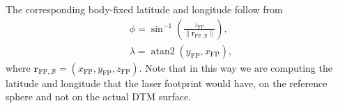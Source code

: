 \documentclass[lineno, pdflatex,sn-mathphys-ay]{sn-jnl}
\theoremstyle{thmstyleone}%
\theoremstyle{thmstyletwo}%
\theoremstyle{thmstylethree}%
\DeclareMathOperator{\atantwo}{atan2}
\renewcommand{\vec}[1]{\boldsymbol{#1}}
\begin{document}
%
%
The corresponding body-fixed latitude and longitude follow from
%
\begin{subequations}
	\begin{align}
		\phi = \sin^{-1}\!\left(\frac{z_{\mathrm{FP}}}{\| \vec{r}_{\mathrm{FP},\mathcal{B}}\| }\right),
		\\ %
		\lambda = \atantwo\!\left(y_{\mathrm{FP}}, x_{\mathrm{FP}}\right),
	\end{align}
\end{subequations}
%
where $\vec{r}_{\mathrm{FP},\mathcal{B}} = (x_{\mathrm{FP}}, y_{\mathrm{FP}}, z_{\mathrm{FP}})$.
%
Note that in this way we are computing the latitude and longitude that the laser footprint would have, on the reference sphere and not on the actual DTM surface.
\end{document}

